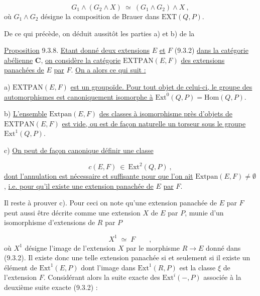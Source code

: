 \begin{equation}\tag{9.3.7}
G_1 \wedge (G_2 \wedge X) \ \simeq \ (G_1 \wedge G_2) \wedge X \ ,
\end{equation}
où $G_1 \wedge G_2$ désigne la composition de Brauer dans $\mathrm{EXT}(Q,P)$.

De ce qui précède, on déduit aussitôt les parties a) et b) de la

\underline{Proposition} 9.3.8. \underline{Etant donné deux extensions} $E$ \underline{et} $F$ (9.3.2) \underline{dans la catégorie abélienne} $\mathbf{C}$, \underline{on considère la catégorie} $\mathrm{EXTPAN}(E,F)$ \underline{des extensions panachées de} $E$ \underline{par} $F$. \underline{On a alors ce qui suit :}

a) $\mathrm{EXTPAN}(E,F)$ \underline{est un groupoïde. Pour tout objet de celui-ci, le groupe des automorphismes est canoniquement isomorphe à} $\mathrm{Ext}^{0}(Q,P) = \mathrm{Hom}(Q,P)$.

b) \underline{L'ensemble} $\mathrm{Extpan}(E,F)$ \underline{des classes à isomorphisme près d'objets de} $\mathrm{EXTPAN}(E,F)$ \underline{est vide, ou est de façon naturelle un torseur sous le groupe} $\mathrm{Ext}^{1}(Q,P)$.

c) \underline{On peut de façon canonique définir une classe}

\begin{equation}\tag{9.3.9}
c(E,F) \ \in \ \mathrm{Ext}^{2}(Q,P) \ ,
\end{equation}
\underline{dont l'annulation est nécessaire et suffisante pour que l'on ait} $\mathrm{Extpan}(E,F) \neq \emptyset$ , \underline{i.e. pour qu'il existe une extension panachée de} $E$ \underline{par} $F$.



Il reste à prouver c). Pour ceci on note qu'une extension panachée de $E$ par $F$ peut aussi être décrite comme une extension $X$ de $E$ par $P$, munie d'un isomorphisme d'extensions de $R$ par $P$

\begin{equation*}
X^1 \;\simeq\; F \qquad ,
\end{equation*}
où $X^1$ désigne l'image de l'extension $X$ par le morphisme $R \longrightarrow E$ donné dans (9.3.2). Il existe donc une telle extension panachée si et seulement si il existe un élément de $\mathrm{Ext}^1(E,P)$ dont l'image dans $\mathrm{Ext}^1(R,P)$ est la classe $\xi$ de l'extension $F$. Considérant alors la suite exacte des $\mathrm{Ext}^i( - ,P)$ associée à la deuxième suite exacte (9.3.2) :

